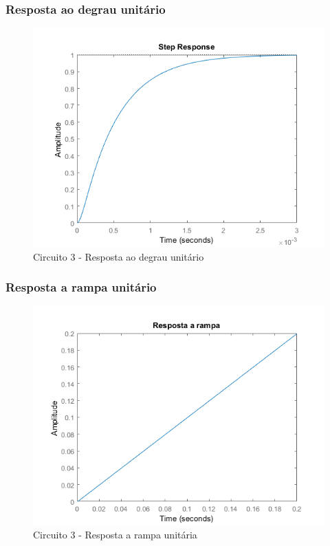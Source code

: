\documentclass[a4paper, 12pt]{article}
\begin{document}
			\subsubsection{Resposta ao degrau unitário}
			\begin{figure}[!ht]
				\centering
				\includegraphics[scale=0.71]{img/1g_circ3.png}
				\caption{Circuito 3 - Resposta ao degrau unitário}	
			\end{figure}					
			\subsubsection{Resposta a rampa unitário}
			\begin{figure}[!ht]
				\centering
				\includegraphics[scale=0.72]{img/1h_circ3.png}
				\caption{Circuito 3 - Resposta a rampa unitária}	
			\end{figure}		
			
\end{document}
